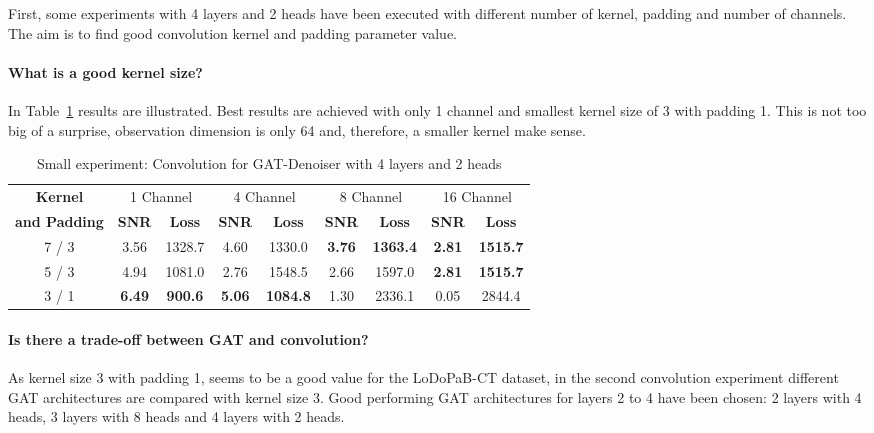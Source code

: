 First, some experiments with 4 layers and 2 heads have been executed with different number of kernel, padding and number of channels.
The aim is to find good convolution kernel and padding parameter value.

\paragraph{What is a good kernel size?}

In Table~\ref{tab:small_convolution} results are illustrated. 
Best results are achieved with only 1 channel and smallest kernel size of 3 with padding 1.
This is not too big of a surprise, observation dimension is only 64 and, therefore, a smaller kernel make sense.


\begin{table}[H]
  \centering
  \begin{tabular}{c|cc|cc|cc|cc}
    \toprule
    \textbf{Kernel}  & \multicolumn{2}{c|}{1 Channel} & \multicolumn{2}{c|}{4 Channel} & \multicolumn{2}{c|}{8 Channel} & \multicolumn{2}{c}{16 Channel} \\
    \textbf{and Padding}  & \textbf{SNR} & \textbf{Loss} & \textbf{SNR} & \textbf{Loss} & \textbf{SNR} & \textbf{Loss} & \textbf{SNR} & \textbf{Loss} \\ 
    \midrule
      7 / 3 & 3.56 & 1328.7                  & 4.60  &  1330.0                   & \textbf{3.76} & \textbf{1363.4} & \textbf{2.81}  & \textbf{1515.7} \\ \hline
      5 / 3 & 4.94 & 1081.0                  & 2.76  &  1548.5                   & 2.66 & 1597.0                   & \textbf{2.81}  & \textbf{1515.7} \\ \hline
      3 / 1 & \textbf{6.49} & \textbf{900.6} & \textbf{5.06}  &  \textbf{1084.8} & 1.30 & 2336.1                   & 0.05  & 2844.4 \\

    \midrule
  \end{tabular}

  \caption{Small experiment: Convolution for GAT-Denoiser with 4 layers and 2 heads}
  \label{tab:small_convolution}
\end{table}

\paragraph{Is there a trade-off between GAT and convolution?}

As kernel size 3 with padding 1, seems to be a good value for the LoDoPaB-CT dataset, 
in the second convolution experiment different GAT architectures are compared with kernel size 3.
Good performing GAT architectures for layers 2 to 4 have been chosen: 2 layers with 4 heads, 3 layers with 8 heads
and 4 layers with 2 heads.

